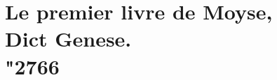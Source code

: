 \documentclass[paper=a5,pagesize=pdftex,15pt,headinclude=on]{scrbook}
\newcommand{\bbook}[4][]{%
  \makebox[\textwidth][c]{\texttt{[image: \#4]}}
  \chapter[#1]{#2,\\\large #3\\\char"2766}
}
\begin{document}
\bbook{Le premier livre de Moyse}{Dict Genese.}{images/genese_heading}
\clrdouble
%
\end{document}
